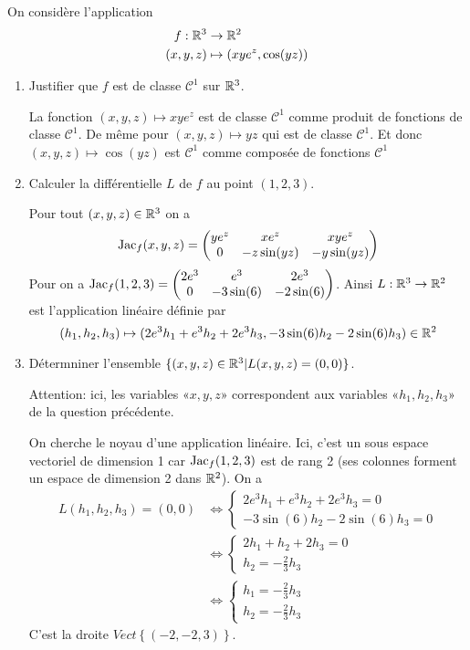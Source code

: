 \documentclass{tp_um}
\begin{document}
\exo{}
On considère l'application 
\begin{align*}
	f : \mathbb{R}^3 & \to \mathbb{R}^2 \\
(x,y,z) & \mapsto (xye^z,\cos(yz))
\end{align*}
\begin{enumerate}
	\item Justifier que $f$ est de classe $\mathcal C^1$ sur $\mathbb{R}^3$.

		\bigskip

		La fonction $( x,y,z) \mapsto  xy e^z$ est de classe $\mathcal C^1$ comme produit de fonctions de classe $\mathcal C^1$. De même pour $( x,y,z) \mapsto  yz$ qui est de classe $\mathcal C^1$. Et donc $( x,y,z) \mapsto  \cos(yz)$ est $\mathcal C^1$ comme composée de fonctions $\mathcal C^1$ 

		\bigskip

	\item Calculer la différentielle $L$ de $f$ au point $(1,2,3)$.
		\bigskip

Pour tout $(x,y,z)\in\mathbb{R}^3$ on a \[
	\operatorname{Jac}_f (x,y,z) = \begin{pmatrix}
		ye^z & xe^z & xy e^z \\
		0 & -z\sin(yz) & -y\sin(yz)
	\end{pmatrix}
\]
Pour on a $	\operatorname{Jac}_f (1,2,3) = \begin{pmatrix}
		2e^3 & e^3 & 2 e^3 \\
		0 & -3\sin(6) & -2\sin(6)
	\end{pmatrix} $.  Ainsi $L: \mathbb{R}^3 \to \mathbb{R}^2$ est l'application linéaire définie par
\[
	(h_1,h_2,h_3) \mapsto  (2e^3 h_1 + e^3 h_2 + 2e^3h_3 ,-3\sin(6) h_2 -2\sin(6) h_3 ) \in \mathbb{R}^2
\]
	\item Détermniner l'ensemble $\{ (x,y,z)\in \mathbb{R}^3 | L(x,y,z) = (0,0) \}$. 

		\bigskip
Attention: ici, les variables «$x,y,z$» correspondent aux variables «$h_1,h_2,h_3$» de la question précédente.

		On cherche le noyau d'une application linéaire. Ici, c'est un sous espace vectoriel de dimension 1 car $\operatorname{Jac}_f(1,2,3)$ est de rang 2 (ses colonnes forment un espace de dimension 2 dans $\mathbb{R}^2$). On a 
		\begin{align*}
			L(h_1,h_2,h_3) = (0,0) & \Leftrightarrow \begin{cases}
				2e^3 h_1 + e^3 h_2 + 2e^3h_3 = 0  \\
				-3\sin(6) h_2 -2\sin(6) h_3 =0
			\end{cases}\\ & \Leftrightarrow \begin{cases}
				2 h_1 + h_2 + 2 h_3 = 0   \\
				h_2  = - \frac 2 3 h_3
			\end{cases}\\ &\Leftrightarrow \begin{cases}
				h_1 = -\frac 2 3 h_3   \\
				h_2  = - \frac 2 3 h_3
			\end{cases} 
		\end{align*}
C'est la droite $Vect\left\{ (-2,-2,3 )\right\}$.
\end{enumerate}
\end{document}

